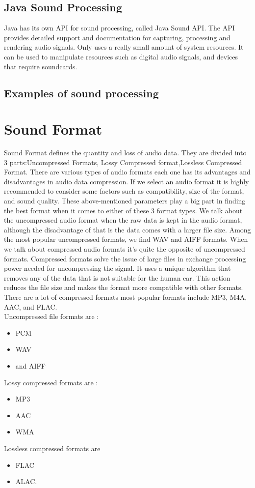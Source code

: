 \documentclass[english,12pt,oneside,a4paper]{article}
\begin{document}
\begin{center}
		\subsection{Java Sound Processing}
		Java has its own API for sound processing, called Java Sound API. The API provides detailed support and documentation for capturing, processing and rendering audio signals. Only uses a really small amount of system resources. It can be used to manipulate resources such as digital audio signals, and devices that require soundcards.
		\subsection{Examples of sound processing}
		
		\section{Sound Format}
		Sound Format defines the  quantity and loss of audio data.
		They are divided into 3 parts:Uncompressed Formats,	Lossy Compressed format,Lossless Compressed Format.
		There are various types of audio formats each one has its advantages and disadvantages in audio data compression. If we select an audio format it is highly recommended to consider some factors such as compatibility, size of the format, and sound quality. These above-mentioned parameters play a big part in finding the best format when it comes to either of these 3 format types. We talk about the uncompressed audio format when the raw data is kept in the audio format, although the disadvantage of that is the data comes with a larger file size. Among the most popular uncompressed formats, we find WAV and AIFF formats. When we talk about compressed audio formats it's quite the opposite of uncompressed formats. Compressed formats solve the issue of large files in exchange processing power needed for uncompressing the signal. It uses a unique algorithm that removes any of the data that is not suitable for the human ear. This action reduces the file size and makes the format more compatible with other formats. There are a lot of compressed formats most popular formats include  MP3, M4A, AAC, and FLAC.
		\\
		Uncompressed file formats are :
		\begin{itemize}
		\item PCM
		\item WAV 
		\item and AIFF
		\end{itemize}
		Lossy compressed formats are : 
		\begin{itemize}
		\item MP3
		\item AAC
		\item WMA
		\end{itemize}
		Lossless compressed formats are
		\begin{itemize}
		\item FLAC
		\item ALAC.
		\end{itemize}
		

\end{center}
\end{document}
